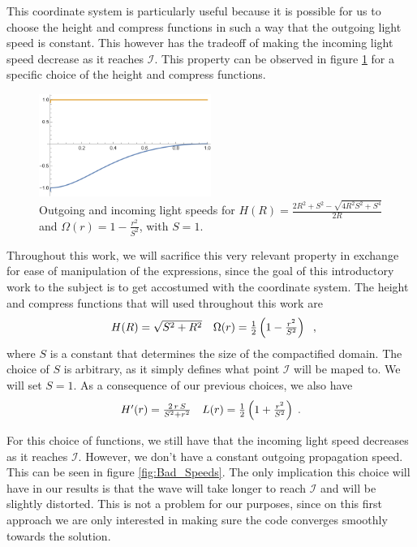 This coordinate system is particularly useful because it is possible for us to choose the height and compress functions in such a way that the outgoing light speed is constant. This however has the tradeoff of making the incoming light speed decrease as it reaches $\mathscr{I}$. This property can be observed in figure \ref{fig:Good_Speeds} for a specific choice of the height and compress functions.

\begin{figure}[h]
    \centering
    \includegraphics[width=0.5\textwidth]{Images/Good_Speeds.png}
    \caption{Outgoing and incoming light speeds for $H(R) = \frac{2 R^2 + S^2 - \sqrt{4 R^2 S^2 + S^4}}{2R}$ and $\Omega(r) = 1 - \frac{r^2}{S^2}$, with $S = 1$.}
    \label{fig:Good_Speeds}
\end{figure}

Throughout this work, we will sacrifice this very relevant property in exchange for ease of manipulation of the expressions, since the goal of this introductory work to the subject is to get accostumed with the coordinate system. The height and compress functions that will used throughout this work are
%
\begin{equation}
    \begin{array}{c c}
        H(R) = \sqrt{S^2+R^2} & \Omega(r) = \frac{1}{2} \left(1 - \frac{r^2}{S^2}\right)
    \end{array} \; ,
\end{equation}
%
where $S$ is a constant that determines the size of the compactified domain. The choice of $S$ is arbitrary, as it simply defines what point $\mathscr{I}$ will be maped to. We will set $S = 1$. As a consequence of our previous choices, we also have
%
\begin{equation}
    \begin{array}{c c}
        H'(r) = \frac{2 \, r \, S}{S^2 + r^2} & L(r) = \frac{1}{2} \left(1 + \frac{r^2}{S^2}\right) \; .
    \end{array}
\end{equation}

For this choice of functions, we still have that the incoming light speed decreases as it reaches $\mathscr{I}$. However, we don't have a constant outgoing propagation speed. This can be seen in figure \ref{fig:Bad_Speeds}. The only implication this choice will have in our results is that the wave will take longer to reach $\mathscr{I}$ and will be slightly distorted. This is not a problem for our purposes, since on this first approach we are only interested in making sure the code converges smoothly towards the solution.


